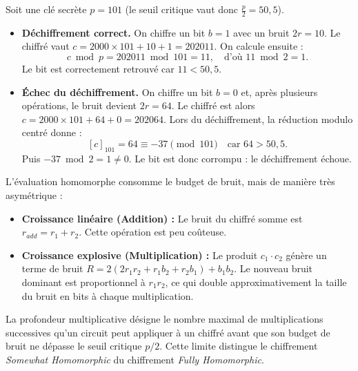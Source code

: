 \begin{example}
Soit une clé secrète $p = 101$ (le seuil critique vaut donc $\frac{p}{2} = 50{,}5$).\\

\begin{itemize}
    \item \textbf{Déchiffrement correct.}  
    On chiffre un bit $b = 1$ avec un bruit $2r = 10$.  
    Le chiffré vaut $c = 2000 \times 101 + 10 + 1 = 202011.$
    On calcule ensuite :
        \[ c \bmod p = 202011 \bmod 101 = 11, \quad \text{d'où } 11 \bmod 2 = 1. \]        
    Le bit est correctement retrouvé car $11 < 50{,}5$.

    \item \textbf{Échec du déchiffrement.}  
    On chiffre un bit $b = 0$ et, après plusieurs opérations, le bruit devient $2r = 64$.  
    Le chiffré est alors $c = 2000 \times 101 + 64 + 0 = 202064.$
    Lors du déchiffrement, la réduction modulo centré donne :
        \[ [c]_{101} = 64 \equiv -37 \pmod{101} \quad \text{car } 64 > 50{,}5. \]
    Puis $-37 \bmod 2 = 1 \neq 0.$
    Le bit est donc corrompu : le déchiffrement échoue.
\end{itemize}
\end{example}

\begin{proposition}
L'évaluation homomorphe consomme le budget de bruit, mais de manière très asymétrique :
\begin{itemize}
    \item \textbf{Croissance linéaire (Addition) :} Le bruit du chiffré somme est $r_{add} = r_1 + r_2$. Cette opération est peu coûteuse.
    \item \textbf{Croissance explosive (Multiplication) :} Le produit $c_1 \cdot c_2$ génère un terme de bruit $R = 2(2r_1r_2 + r_1b_2 + r_2b_1) + b_1b_2$. Le nouveau bruit dominant est proportionnel à $r_1r_2$, ce qui double approximativement la taille du bruit en bits à chaque multiplication.
\end{itemize}
\end{proposition}

\begin{definition}
La profondeur multiplicative désigne le nombre maximal de multiplications successives qu'un circuit peut appliquer à un chiffré avant que son budget de bruit ne dépasse le seuil critique $p/2$. Cette limite distingue le chiffrement \textit{Somewhat Homomorphic} du chiffrement \textit{Fully Homomorphic}.
\end{definition}

